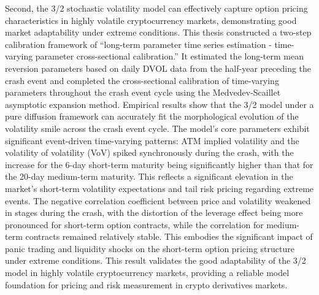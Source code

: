 Second, the 3/2 stochastic volatility model can effectively capture option pricing characteristics in highly volatile cryptocurrency markets, demonstrating good market adaptability under extreme conditions. This thesis constructed a two-step calibration framework of ``long-term parameter time series estimation - time-varying parameter cross-sectional calibration.'' It estimated the long-term mean reversion parameters based on daily DVOL data from the half-year preceding the crash event and completed the cross-sectional calibration of time-varying parameters throughout the crash event cycle using the Medvedev-Scaillet asymptotic expansion method. Empirical results show that the 3/2 model under a pure diffusion framework can accurately fit the morphological evolution of the volatility smile across the crash event cycle. The model's core parameters exhibit significant event-driven time-varying patterns: ATM implied volatility and the volatility of volatility (VoV) spiked synchronously during the crash, with the increase for the 6-day short-term maturity being significantly higher than that for the 20-day medium-term maturity. This reflects a significant elevation in the market's short-term volatility expectations and tail risk pricing regarding extreme events. The negative correlation coefficient between price and volatility weakened in stages during the crash, with the distortion of the leverage effect being more pronounced for short-term option contracts, while the correlation for medium-term contracts remained relatively stable. This embodies the significant impact of panic trading and liquidity shocks on the short-term option pricing structure under extreme conditions. This result validates the good adaptability of the 3/2 model in highly volatile cryptocurrency markets, providing a reliable model foundation for pricing and risk measurement in crypto derivatives markets.


